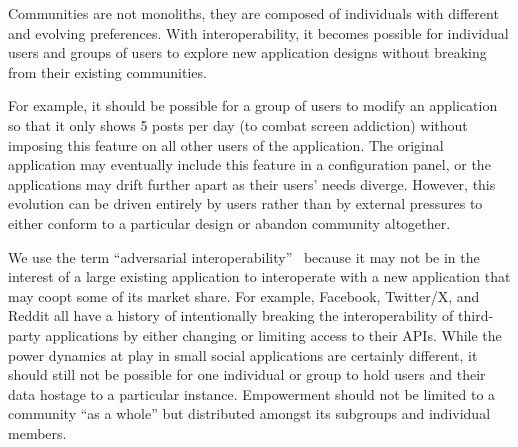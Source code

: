 Communities are not monoliths, they are composed of individuals
with different and evolving preferences.
With interoperability, it becomes possible for individual users and groups of users to explore new application designs
without breaking from their existing communities.

For example, it should be possible for a group of users to
modify an application so that it only shows 5 posts per day (to combat screen addiction)
without imposing this feature on all other users of the application.
The original application may eventually include this feature in a configuration panel,
or the applications may drift further apart as their users' needs diverge. However, this
evolution can be driven entirely by users rather than by external pressures
to either conform to a particular design or abandon community altogether.


We use the term ``adversarial interoperability''~\cite{adversarialinterop} because it may not be in the
interest of a large existing application to interoperate with a new application that may coopt some of its market share.
For example, Facebook, Twitter/X, and Reddit all have a history of intentionally breaking
the interoperability of third-party applications by either changing or limiting access to their APIs.
While the power dynamics at play in small social applications are certainly
different,
it should still not be possible for one individual or group to hold users
and their data hostage to a particular instance.
Empowerment should not be limited to a community ``as a whole'' but
distributed amongst its subgroups and individual members.





